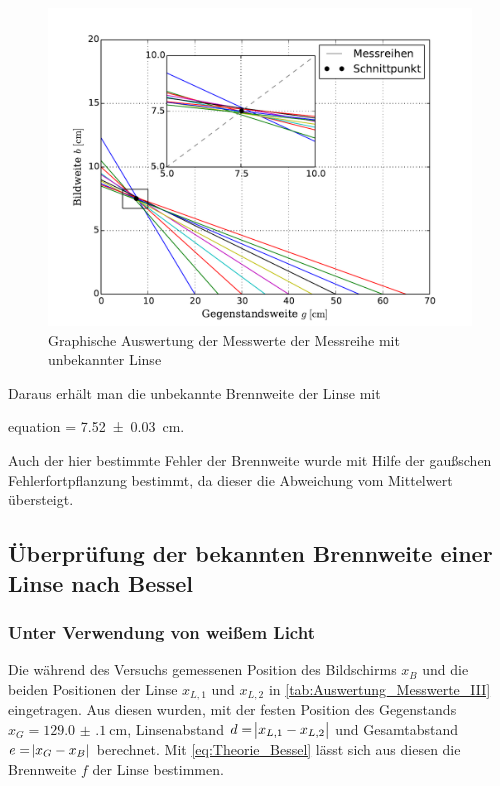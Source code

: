 	\begin{figure}[!h]
		\centering
		\includegraphics[scale=.7]{Grafiken/Messwerte_Unbekannt.pdf}
		\caption{Graphische Auswertung der Messwerte der Messreihe mit unbekannter Linse \label{fig:Auswertung_UnbekannteLinse}}
	\end{figure}  
	
	
	Daraus erhält man die unbekannte Brennweite der Linse mit 
	 \begin{empheq}{equation}
			\label{val:Auswertung_Unbekannt}
			 = \SI{7.52(3)}{\centi\meter}.
	 \end{empheq}
	Auch der hier bestimmte Fehler der Brennweite wurde mit Hilfe der gaußschen Fehlerfortpflanzung bestimmt,
	da dieser die Abweichung vom Mittelwert übersteigt. 

\subsection{Überprüfung der bekannten Brennweite einer Linse nach Bessel}

	\subsubsection{Unter Verwendung von weißem Licht}
	
		Die während des Versuchs gemessenen Position des Bildschirms $x_{B}$ und
		die beiden Positionen der Linse $x_{L,1}$ und $x_{L,2}$ in \cref{tab:Auswertung_Messwerte_III} eingetragen. 
		Aus diesen wurden, mit der festen Position des Gegenstands $x_{G} = \SI{129.0(1)}{\centi\meter}$,
		Linsenabstand $d = \envert{x_{L,1} - x_{L,2}}$ und Gesamtabstand $e = \envert{x_{G}- x_{B}}$ 
		berechnet. Mit \cref{eq:Theorie_Bessel} lässt sich aus diesen die Brennweite $f$ der Linse bestimmen.
		
